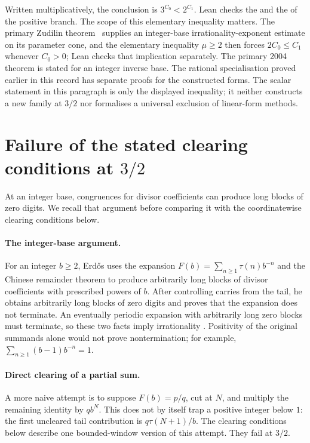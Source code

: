 \noindent Written multiplicatively, the conclusion is \(3^{C_0}<2^{C_1}\).
Lean checks the
and the
of the positive branch.
The scope of this elementary inequality matters.  The primary Zudilin
theorem~\cite[Theorem~1, p.~154; Sec.~5, pp.~161--162]{zudilin2004} supplies an integer-base
irrationality-exponent estimate on its parameter cone, and the elementary
inequality \(\mu\ge2\) then forces \(2C_0\le C_1\) whenever \(C_0>0\); Lean
checks that implication separately.  The primary 2004 theorem is stated for an integer inverse base.
The rational specialisation proved earlier in this record has separate
proofs for the constructed forms. The scalar statement in this paragraph is
only the displayed inequality; it neither constructs a new family at
$3/2$ nor formalises a universal exclusion of linear-form methods.

\section{Failure of the stated clearing conditions at \texorpdfstring{$3/2$}{3/2}}\label{long1049:sec:corridor}

At an integer base, congruences for divisor coefficients can produce
long blocks of zero digits. We recall that argument before comparing
it with the coordinatewise clearing conditions below.

\paragraph{The integer-base argument.}
For an integer $b\ge2$, Erd\H{o}s uses the expansion
$F(b)=\sum_{n\ge1}\tau(n)b^{-n}$ and the Chinese remainder theorem to
produce arbitrarily long blocks of divisor coefficients with prescribed
powers of $b$. After controlling carries from the tail, he obtains
arbitrarily long blocks of zero digits and proves that the expansion
does not terminate. An eventually periodic expansion with arbitrarily
long zero blocks must terminate, so these two facts imply irrationality
\cite[pp.~63--66]{erdos1948}.
Positivity of the original summands alone would not prove nontermination;
for example, $\sum_{n\ge1}(b-1)b^{-n}=1$.

\paragraph{Direct clearing of a partial sum.}
A more naive attempt is to suppose $F(b)=p/q$, cut at $N$, and multiply the
remaining identity by $qb^N$.  This does not by itself trap a positive integer
below $1$: the first uncleared tail contribution is
$q\tau(N+1)/b$.  The clearing conditions below describe one bounded-window version
of this attempt. They fail at $3/2$.

